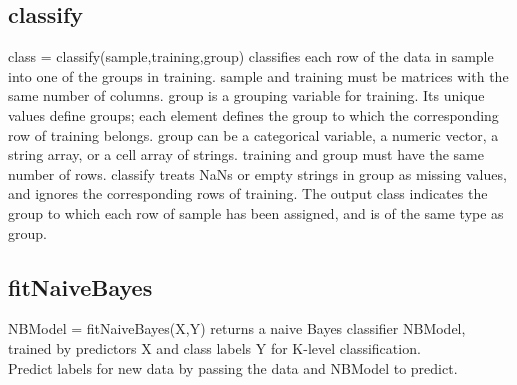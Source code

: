 \documentclass[12pt,letterpaper]{article}
\begin{document}
\subsection{classify}
class = classify(sample,training,group) classifies each row of the data in sample into one of the groups in training. sample and training must be matrices with the same number of columns. group is a grouping variable for training. Its unique values define groups; each element defines the group to which the corresponding row of training belongs. group can be a categorical variable, a numeric vector, a string array, or a cell array of strings. training and group must have the same number of rows. classify treats NaNs or empty strings in group as missing values, and ignores the corresponding rows of training. The output class indicates the group to which each row of sample has been assigned, and is of the same type as group.

\subsection{fitNaiveBayes}
NBModel = fitNaiveBayes(X,Y) returns a naive Bayes classifier NBModel, trained by predictors X and class labels Y for K-level classification.\\
Predict labels for new data by passing the data and NBModel to predict.
\end{document}
